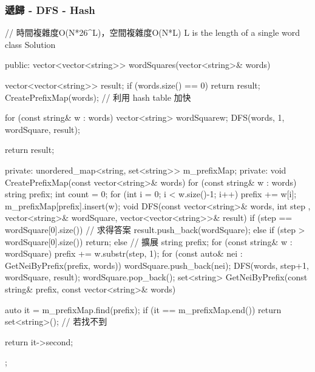 \subsubsection{遞歸 - DFS - Hash}
\begin{Code}
// 時間複雜度O(N*26^L)，空間複雜度O(N*L) L is the length of a single word
class Solution {
public:
    vector<vector<string>> wordSquares(vector<string>& words) {
        vector<vector<string>> result;
        if (words.size() == 0) return result;
        CreatePrefixMap(words); // 利用 hash table 加快


        for (const string& w : words)
        {
            vector<string> wordSquare{w};
            DFS(words, 1, wordSquare, result);
        }

        return result;
    }
private:
    unordered_map<string, set<string>> m_prefixMap;
private:
    void CreatePrefixMap(const vector<string>& words)
    {
        for (const string& w : words)
        {
            string prefix;
            int count = 0;
            for (int i = 0; i < w.size()-1; i++)
            {
                prefix += w[i];
                m_prefixMap[prefix].insert(w);
            }
        }
    }
    void DFS(const vector<string>& words, int step
             , vector<string>& wordSquare, vector<vector<string>>& result)
    {
        if (step == wordSquare[0].size())
        {
            // 求得答案
            result.push_back(wordSquare);
        }
        else if (step > wordSquare[0].size())
            return;
        else
        {
            // 擴展
            string prefix;
            for (const string& w : wordSquare)
                prefix += w.substr(step, 1);
            for (const auto& nei : GetNeiByPrefix(prefix, words))
            {
                wordSquare.push_back(nei);
                DFS(words, step+1, wordSquare, result);
                wordSquare.pop_back();
            }
        }
    }
    set<string> GetNeiByPrefix(const string& prefix, const vector<string>& words)
    {
        auto it = m_prefixMap.find(prefix);
        if (it == m_prefixMap.end()) return set<string>(); // 若找不到

        return it->second;
    }
};
\end{Code}

